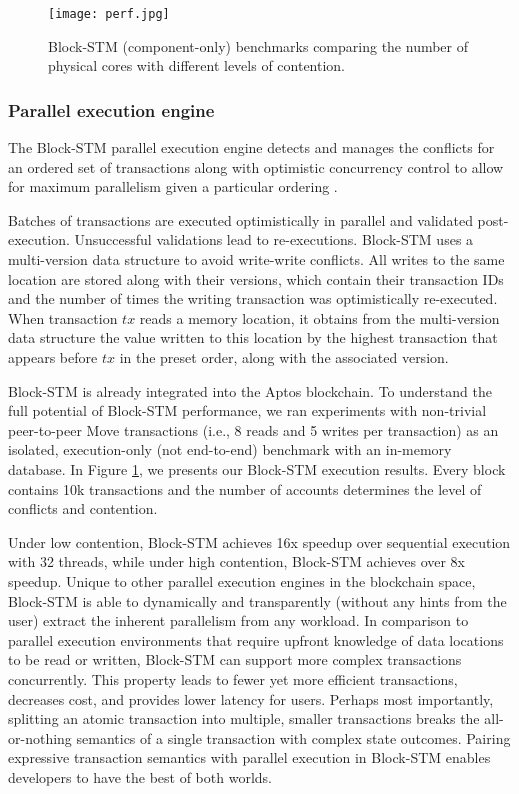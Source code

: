\documentclass{article}
\begin{document}
\begin{figure}
\centering
\texttt{[image: perf.jpg]}
\caption{\label{fig:perf}Block-STM (component-only) benchmarks comparing the number of physical cores with different levels of contention.}
\end{figure}

\subsubsection{Parallel execution engine}

The Block-STM parallel execution engine detects and manages the conflicts for an ordered set of transactions along with optimistic concurrency control to allow for maximum parallelism given a particular ordering \cite{block_stm}.

Batches of transactions are executed optimistically in parallel and validated post-execution. Unsuccessful validations lead to re-executions. Block-STM uses a multi-version data structure to avoid write-write conflicts. All writes to the same location are stored along with their versions, which contain their transaction IDs and the number of times the writing transaction was optimistically re-executed. When transaction $tx$ reads a memory location, it obtains from the multi-version data structure the value written to this location by the highest transaction that appears before $tx$ in the preset order, along with the associated version. 

Block-STM is already integrated into the Aptos blockchain. To understand the full potential of Block-STM performance, we ran experiments with non-trivial peer-to-peer Move transactions (i.e., 8 reads and 5 writes per transaction) as an isolated, execution-only (not end-to-end) benchmark with an in-memory database. In Figure \ref{fig:perf}, we presents our Block-STM execution results. Every block contains 10k transactions and the number of accounts determines the level of conflicts and contention.

Under low contention, Block-STM achieves 16x speedup over sequential execution with 32 threads, while under high contention, Block-STM achieves over 8x speedup. Unique to other parallel execution engines in the blockchain space, Block-STM is able to dynamically and transparently (without any hints from the user) extract the inherent parallelism from any workload.  In comparison to parallel execution environments that require upfront knowledge of data locations to be read or written, Block-STM can support more complex transactions concurrently. This property leads to fewer yet more efficient transactions, decreases cost, and provides lower latency for users. Perhaps most importantly, splitting an atomic transaction into multiple, smaller transactions breaks the all-or-nothing semantics of a single transaction with complex state outcomes. Pairing expressive transaction semantics with parallel execution in Block-STM enables developers to have the best of both worlds.
\end{document}
